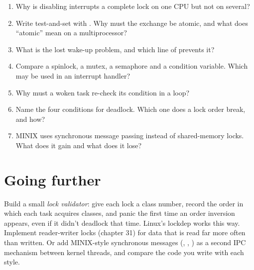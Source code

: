\documentclass[11pt,a4paper]{article}
\begin{document}
\begin{questionbox}
\begin{enumerate}
  \item Why is disabling interrupts a complete lock on one CPU but not on several?
  \item Write test-and-set with . Why must the exchange be atomic, and what does ``atomic'' mean on a multiprocessor?
  \item What is the lost wake-up problem, and which line of  prevents it?
  \item Compare a spinlock, a mutex, a semaphore and a condition variable. Which may be used in an interrupt handler?
  \item Why must a woken task re-check its condition in a  loop?
  \item Name the four conditions for deadlock. Which one does a lock order break, and how?
  \item MINIX uses synchronous message passing instead of shared-memory locks. What does it gain and what does it lose?
\end{enumerate}
\end{questionbox}

\section{Going further}

Build a small \emph{lock validator}: give each lock a class number, record the order in which each task acquires
classes, and panic the first time an order inversion appears, even if it didn't deadlock that time. Linux's lockdep
works this way. Implement reader-writer locks (\OSTEP chapter 31) for data that is read far more often than written.
Or add MINIX-style synchronous messages (, , ) as a second IPC mechanism
between kernel threads, and compare the code you write with each style.

\booklegend
\end{document}
